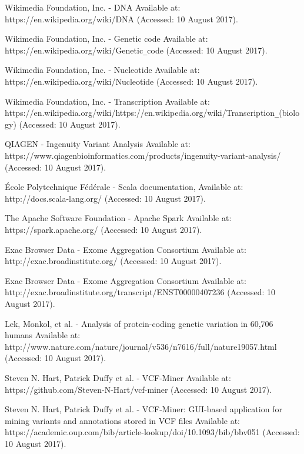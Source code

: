 \documentclass[a4paper,12pt,twoside]{article}
\begin{document}
\newpage


\begin{thebibliography}{99}

Wikimedia Foundation, Inc.  - DNA
Available at: https://en.wikipedia.org/wiki/DNA (Accessed: 10 August 2017).

Wikimedia Foundation, Inc.  - Genetic code
Available at: https://en.wikipedia.org/wiki/Genetic\verb!_!code (Accessed: 10 August 2017).

Wikimedia Foundation, Inc.  - Nucleotide
Available at: https://en.wikipedia.org/wiki/Nucleotide (Accessed: 10 August 2017).

Wikimedia Foundation, Inc.  - Transcription
Available at: https://en.wikipedia.org/wiki/https://en.wikipedia.org/wiki/Transcription\verb!_!(biology) (Accessed: 10 August 2017).

QIAGEN - Ingenuity Variant Analysis
Available at: https://www.qiagenbioinformatics.com/products/ingenuity-variant-analysis/ (Accessed: 10 August 2017).

École Polytechnique Fédérale - Scala documentation,
Available at: http://docs.scala-lang.org/ (Accessed: 10 August 2017).

The Apache Software Foundation - Apache Spark Available at: https://spark.apache.org/ (Accessed: 10 August 2017).

Exac Browser Data - Exome Aggregation Consortium  
Available at: http://exac.broadinstitute.org/ (Accessed: 10 August 2017).

Exac Browser Data - Exome Aggregation Consortium  
Available at: http://exac.broadinstitute.org/transcript/ENST00000407236 (Accessed: 10 August 2017).

Lek, Monkol, et al. - Analysis of protein-coding genetic variation in 60,706 humans
Available at: http://www.nature.com/nature/journal/v536/n7616/full/nature19057.html
(Accessed: 10 August 2017).

Steven N. Hart, Patrick Duffy et al. - VCF-Miner 
Available at: https://github.com/Steven-N-Hart/vcf-miner (Accessed: 10 August 2017).

Steven N. Hart, Patrick Duffy et al. - VCF-Miner: GUI-based application for mining variants and annotations stored in VCF files 
Available at: https://academic.oup.com/bib/article-lookup/doi/10.1093/bib/bbv051 (Accessed: 10 August 2017).


\end{thebibliography}
\end{document}
